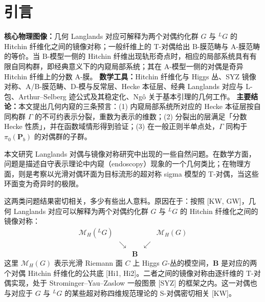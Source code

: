 

\section{引言}

\begin{keytakeaway}
\textbf{核心物理图像：}几何 Langlands 对应可解释为两个对偶约化群 $G$ 与 ${}^{L}G$ 的 Hitchin 纤维化之间的镜像对称；一般纤维上的 T-对偶给出 B-膜范畴与 A-膜范畴的等价。当 B-模型一侧的 Hitchin 纤维出现轨形奇点时，相应的局部系统具有有限自同构群，即经典意义下的内窥局部系统；其在 A-模型一侧的对偶是奇异 Hitchin 纤维上的分数 A-膜。
\textbf{数学工具：}Hitchin 纤维化与 Higgs 丛、SYZ 镜像对称、A/B-膜范畴、D-模与反常层、Hecke 本征层、经典 Langlands 对应与 L-包、Arthur--Selberg 迹公式及其稳定化、Ngô 关于基本引理的几何工作。
\textbf{主要结论：}本文提出几何内窥的三条预言：(1) 内窥局部系统所对应的 Hecke 本征层按自同构群 $\Gamma$ 的不可约表示分裂，重数为表示的维数；(2) 分裂出的层满足「分数 Hecke 性质」，并在函数域情形得到验证；(3) 在一般正则半单点处，$\Gamma$ 同构于 $\pi_0(\boldsymbol{P}_b)$ 的对偶群的子群。
\end{keytakeaway}

本文研究 Langlands 对偶与镜像对称研究中出现的一些自然问题。在数学方面，问题是描述自守表示理论中内窥（endoscopy）现象的一个几何类比；在物理方面，则是考察以光滑对偶环面为目标流形的超对称 sigma 模型的 T-对偶，当这些环面变为奇异时的极限。

这两类问题结果密切相关，多少有些出人意料。原因在于：按照 [KW, GW]，几何 Langlands 对应可以解释为两个对偶约化群 $G$ 与 ${}^{L}G$ 的 Hitchin 纤维化之间的镜像对称：
\[
\begin{array}{ccccc}
\mathcal{M}_H({}^{L}G) & & & & \mathcal{M}_H(G)\\[2pt]
& \searrow & & \swarrow & \\[2pt]
& & \boldsymbol{B} & &
\end{array}
\]
这里 $\mathcal{M}_H(G)$ 表示光滑 Riemann 面 $C$ 上 Higgs $G$-丛的模空间，$\boldsymbol{B}$ 是对应的两个对偶 Hitchin 纤维化的公共底 [Hi1, Hi2]。二者之间的镜像对称由逐纤维的 T-对偶实现，处于 Strominger--Yau--Zaslow 一般图景 [SYZ] 的框架之内。这一对偶也与对应于 $G$ 与 ${}^{L}G$ 的某些超对称四维规范理论的 S-对偶密切相关 [KW]。

